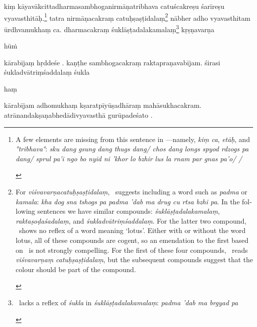 \documentclass[naipra.tex]{subfiles}
\begin{document}
\begin{sanskrit}
\pstart
kiṃ  kāyavākcittadharmasambhoganirmāṇatribhava catuścakreṣu śarīreṣu vyavasthitāḥ.\footnote{
	\begin{english}%
		A few elements are missing from this sentence in \TIB —namely, \emph{kiṃ ca}, \emph{etāḥ}, and \emph{°tribhava°}: \emph{sku dang gsung dang thugs dang/ chos dang longs spyod rdzogs pa dang/ sprul pa’i ngo bo nyid ni ’khor lo bzhir lus la rnam par gnas pa’o/ /}
	\end{english}
}
tatra nirmāṇacakraṃ catuḥṣaṣṭidalaṃ\footnote{
	\begin{english}%
		For \emph{viśvavarṇacatuḥṣaṣṭidalaṃ}, \TIB\ suggests including a word such as \emph{padma} or \emph{kamala}: \emph{kha dog sna tshogs pa padma 'dab ma drug cu rtsa bzhi pa}.
		In the following sentences we have similar compounds: \emph{śuklāṣṭadalakamalaṃ}, \emph{raktaṣoḍaśadalaṃ}, and \emph{śukladvātriṃśaddalaṃ}. 
		For the latter two compound, \TIB\ shows no reflex of a word meaning `lotus'.
		Either with or without the word lotus, all of these compounds are cogent, so an emendation to the first based on \TIB\ is not strongly compelling.
		For the first of these four compounds, \MSN\ reads \emph{viśvavarṇaṃ catuḥṣaṣṭidalaṃ}, but the subsequent compounds suggest that the colour should be part of the compound.
	\end{english}
}
  nābher adho vyavasthitam ūrdhvamukhaṃ ca.
dharmacakraṃ śuklāṣṭadalakamalaṃ\footnote{
	\begin{english}%
		\TIB\ lacks a reflex of \emph{śukla} in \emph{śuklāṣṭadalakamalaṃ}: \emph{padma 'dab ma brgyad pa} 
	\end{english}
} kṛṣṇavarṇa\dsh \begin{mantra}hūṁ\end{mantra}\dsh kārabījaṃ hṛddeśe . 
kaṇṭhe sambhogacakraṃ  raktapraṇavabījam.
śirasi śukladvātriṃśaddalaṃ śukla\dsh \begin{mantra}haṃ\end{mantra}\dsh kārabījam adhomukhaṃ kṣaratpīyūṣadhāraṃ mahāsukhacakram. 
atrānandakṣaṇabhedādivyavasthā gurūpadeśato .
\pend


\end{sanskrit}
\end{document}
